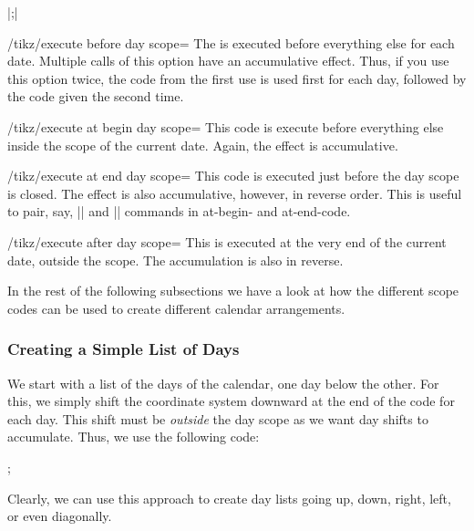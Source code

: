 \begin{command}{\calendar {}|;|}
    \begin{key}{/tikz/execute before day scope=}
        The  is executed before everything else for each date.
        Multiple calls of this option have an accumulative effect. Thus, if you
        use this option twice, the code from the first use is used first for
        each day, followed by the code given the second time.
    \end{key}
    \begin{key}{/tikz/execute at begin day scope=}
        This code is execute before everything else inside the scope of the
        current date. Again, the effect is accumulative.
    \end{key}
    \begin{key}{/tikz/execute at end day scope=}
        This code is executed just before the day scope is closed. The effect
        is also accumulative, however, in reverse order. This is useful to
        pair, say, |\scope| and |\endscope| commands in at-begin- and
        at-end-code.
    \end{key}
    \begin{key}{/tikz/execute after day scope=}
        This is executed at the very end of the current date, outside the
        scope. The accumulation is also in reverse.
    \end{key}
\end{command}

In the rest of the following subsections we have a look at how the different
scope codes can be used to create different calendar arrangements.


\subsubsection{Creating a Simple List of Days}

We start with a list of the days of the calendar, one day below the other. For
this, we simply shift the coordinate system downward at the end of the code for
each day. This shift must be \emph{outside} the day scope as we want day shifts
to accumulate. Thus, we use the following code:
%
\begin{codeexample}[preamble={\usetikzlibrary{calendar}}]
\tikz
  \calendar [dates=2000-01-01 to 2000-01-08,
             execute after day scope=
               {\pgftransformyshift{-1em}}];
\end{codeexample}
%
Clearly, we can use this approach to create day lists going up, down, right,
left, or even diagonally.


